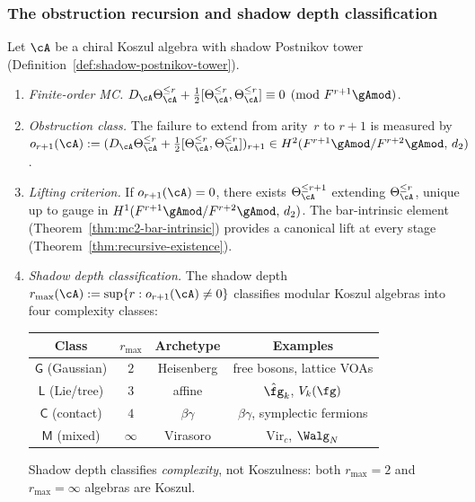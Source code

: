 
\subsubsection{The obstruction recursion and shadow depth
classification}

\begin{theorem}
\label{thm:obstruction-recursion}
\ClaimStatusProvedHere
{}
Let $\cA$ be a chiral Koszul algebra with shadow
Postnikov tower
\textup{(}Definition~\textup{\ref{def:shadow-postnikov-tower}}\textup{)}.
\begin{enumerate}[label=\textup{(\roman*)}]
\item \emph{Finite-order MC.}
  $D_\cA \Theta_\cA^{\leq r}
  + \tfrac{1}{2}[\Theta_\cA^{\leq r}, \Theta_\cA^{\leq r}]
  \equiv 0 \pmod{F^{r+1}\gAmod}$.
\item \emph{Obstruction class.}
  The failure to extend from arity~$r$ to $r+1$ is
  measured by
  $o_{r+1}(\cA)
  := (D_\cA\Theta_\cA^{\leq r}
  + \tfrac{1}{2}[\Theta_\cA^{\leq r},
  \Theta_\cA^{\leq r}])_{r+1}
  \in H^2(F^{r+1}\gAmod / F^{r+2}\gAmod,\, d_2)$.
\item \emph{Lifting criterion.}
  If $o_{r+1}(\cA) = 0$, there exists
  $\Theta_\cA^{\leq r+1}$ extending
  $\Theta_\cA^{\leq r}$,
  unique up to gauge in
  $H^1(F^{r+1}\gAmod / F^{r+2}\gAmod,\, d_2)$.
  The bar-intrinsic element
  \textup{(}Theorem~\textup{\ref{thm:mc2-bar-intrinsic}}\textup{)}
  provides a canonical lift at every stage
  \textup{(}Theorem~\textup{\ref{thm:recursive-existence}}\textup{)}.
\item \emph{Shadow depth classification.}
  The shadow depth
  $r_{\max}(\cA) := \sup\{r : o_{r+1}(\cA) \neq 0\}$
  classifies modular Koszul algebras into four
  complexity classes:
  \begin{center}
  \begin{tabular}{cccc}
  \toprule
  Class & $r_{\max}$ & Archetype & Examples \\
  \midrule
  $\mathsf{G}$ (Gaussian) & $2$
    & Heisenberg & free bosons, lattice VOAs \\
  $\mathsf{L}$ (Lie/tree) & $3$
    & affine & $\hat{\fg}_k$, $V_k(\fg)$ \\
  $\mathsf{C}$ (contact) & $4$
    & $\beta\gamma$ & $\beta\gamma$, symplectic fermions \\
  $\mathsf{M}$ (mixed) & $\infty$
    & Virasoro & $\mathrm{Vir}_c$, $\Walg_N$ \\
  \bottomrule
  \end{tabular}
  \end{center}
  Shadow depth classifies \emph{complexity}, not
  Koszulness:
  both $r_{\max} = 2$ and $r_{\max} = \infty$ algebras
  are Koszul.
\end{enumerate}
\end{theorem}

